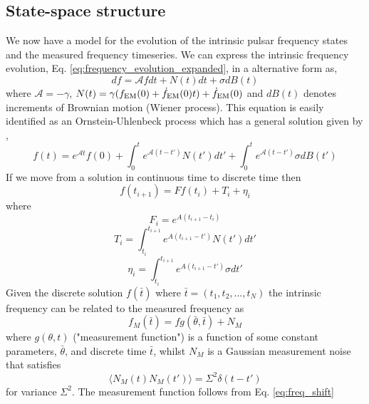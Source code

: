 \documentclass[fleqn,usenatbib,useAMS]{mnras}
\begin{document}
\subsection{State-space structure} \label{sec3}
We now have a model for the evolution of the intrinsic pulsar frequency states and the measured frequency timeseries. We can express the intrinsic frequency evolution, Eq. \ref{eq:frequency_evolution_expanded}, in a alternative form as,
\begin{equation}
	df = \mathcal{A} f dt + N(t) dt + \sigma dB(t)
	\label{eq:state1}
\end{equation}
where $\mathcal{A} = -\gamma$, $N(t) = \gamma(f_{\rm EM}(0) + \dot{f}_{\rm EM}(0) t) +\dot{f}_{\rm EM}(0)$ and $dB(t)$ denotes increments of Brownian motion (Wiener process). This equation is easily identified as an Ornstein-Uhlenbeck process which has a general solution given by \citep{gardiner2009stochastic},
\begin{equation}
	f(t) = e^{\mathcal{A}t}f(0) + \int_0^t e^{\mathcal{A}(t-t')} N(t') dt' + \int_0^t e^{\mathcal{A}(t-t')} \sigma dB(t')
\end{equation} 
If we move from a solution in continuous time to discrete time then
\begin{equation}
	f(t_{i+1}) = F f(t_i) + T_i + \eta_i
\end{equation}
where
\begin{equation}
	F_i = e^{A (t_{i+1} - t_i)}
\end{equation}
\begin{equation}
	T_i = \int_{t_i}^{t_{i+1}}  e^{A (t_{i+1} - t')} N(t') dt'
\end{equation}
\begin{equation}
	\eta_i = \int_{t_i}^{t_{i+1}}  e^{A (t_{i+1} - t')} \sigma dt'
\end{equation}
Given the discrete solution $f(\bar{t})$ where $\bar{t} = (t_1, t_2, ...,t_N)$ the intrinsic frequency can be related to the measured frequency as 
\begin{equation}
	f_M (\bar{t})= f g(\bar{\theta},\bar{t}) + N_M
\end{equation}
where $g(\theta,t)$ ("measurement function") is a function of some constant parameters, $\bar{\theta}$, and discrete time $\bar{t}$, whilst $N_M$ is a Gaussian measurement noise that satisfies 
\begin{equation}
	\langle N_M(t) N_M(t') \rangle = \Sigma^2 \delta(t - t')
\end{equation}
for variance $\Sigma^2$. The measurement function follows from Eq. \ref{eq:freq_shift}
\end{document}

